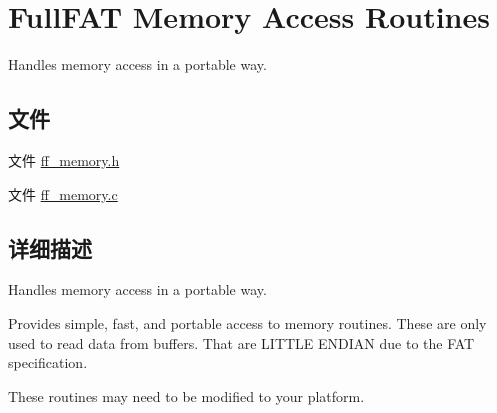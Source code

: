 \hypertarget{group___m_e_m_o_r_y}{}\section{Full\+F\+AT Memory Access Routines}
\label{group___m_e_m_o_r_y}


Handles memory access in a portable way.  


\subsection*{文件}
\begin{DoxyCompactItemize}
\item 
文件 \hyperlink{ff__memory_8h}{ff\+\_\+memory.\+h}
\item 
文件 \hyperlink{ff__memory_8c}{ff\+\_\+memory.\+c}
\end{DoxyCompactItemize}


\subsection{详细描述}
Handles memory access in a portable way. 

Provides simple, fast, and portable access to memory routines. These are only used to read data from buffers. That are L\+I\+T\+T\+LE E\+N\+D\+I\+AN due to the F\+AT specification.

These routines may need to be modified to your platform. 